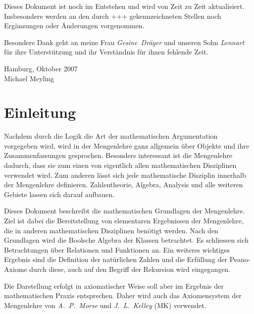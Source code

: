 \documentclass[a4paper,german,10pt,twoside]{book}
\theoremstyle{definition}
\theoremstyle{remark}
\begin{document}
\par
Dieses Dokument ist noch im Entstehen und wird von Zeit zu Zeit aktualisiert. Insbesondere werden an den durch {\glqq+++\grqq} gekennzeichneten Stellen noch Erg{\"a}nzungen oder {\"A}nderungen vorgenommen.

\par
Besondere Dank geht an meine Frau \emph{Gesine~Dr{\"a}ger} und unseren Sohn \emph{Lennart} f{\"u}r ihre Unterst{\"u}tzung und ihr Verst{\"a}ndnis f{\"u}r ihnen fehlende Zeit.

\par
\vspace*{1cm} Hamburg, Oktober 2007 \\
\hspace*{\fill} Michael Meyling


\chapter*{Einleitung\label{ch:introduction}} \label{chapter1} \hypertarget{chapter1}{}

Nachdem durch die Logik die Art der mathematischen Argumentation vorgegeben wird, wird in der Mengenlehre ganz allgemein {\"u}ber Objekte und ihre Zusammenfassungen gesprochen. Besonders interessant ist die Mengenlehre dadurch, dass sie zum einen von eigentlich allen mathematischen Disziplinen verwendet wird. Zum anderen l{\"a}sst sich jede mathematische Disziplin innerhalb der Mengenlehre definieren. Zahlentheorie, Algebra, Analysis und alle weiteren Gebiete lassen sich darauf aufbauen.

  \par
  Dieses Dokument beschreibt die mathematischen Grundlagen der Mengenlehre. Ziel ist dabei die Bereitstellung von elementaren Ergebnissen der Mengenlehre, die in anderen mathematischen Disziplinen ben{\"o}tigt werden. Nach den Grundlagen wird die Boolsche Algebra der Klassen betrachtet. Es schliessen sich Betrachtungen {\"u}ber Relationen und Funktionen an. Ein weiteres wichtiges Ergebnis sind die Definition der nat{\"u}rlichen Zahlen und die Erf{\"u}llung der Peano-Axiome durch diese, auch auf den Begriff der Rekursion wird eingegangen.
 
  \par
  Die Darstellung erfolgt in axiomatischer Weise soll aber im Ergebnis der mathematischen Praxis entsprechen. Daher wird auch das Axiomensystem der Mengenlehre von \emph{A.~P.~Morse} und  \emph{J.~L.~Kelley} (MK) verwendet.
\end{document}
